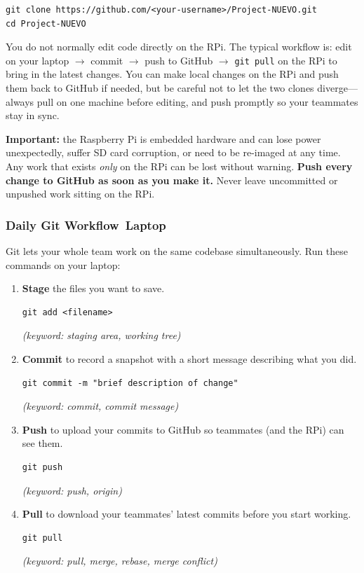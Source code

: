 \documentclass{ol-softwaremanual}
\newcommand{\onlaptop}{%
  \,\colorbox{green!25}{\footnotesize\sffamily\bfseries Laptop}}
\begin{document}
\begin{verbatim}
git clone https://github.com/<your-username>/Project-NUEVO.git
cd Project-NUEVO
\end{verbatim}

\noindent You do not normally edit code directly on the RPi.
The typical workflow is: edit on your laptop $\to$ commit $\to$ push to GitHub
$\to$ \texttt{git pull} on the RPi to bring in the latest changes.
You can make local changes on the RPi and push them back to GitHub if needed,
but be careful not to let the two clones diverge---always pull on one machine
before editing, and push promptly so your teammates stay in sync.

\noindent\textbf{Important:} the Raspberry Pi is embedded hardware and can lose
power unexpectedly, suffer SD card corruption, or need to be re-imaged at any
time. Any work that exists \emph{only} on the RPi can be lost without warning.
\textbf{Push every change to GitHub as soon as you make it.}
Never leave uncommitted or unpushed work sitting on the RPi.

\subsubsection{Daily Git Workflow\onlaptop}

Git lets your whole team work on the same codebase simultaneously.
Run these commands on your laptop:

\begin{enumerate}
  \item \textbf{Stage} the files you want to save.
\begin{verbatim}
git add <filename>
\end{verbatim}
        \hfill\textit{(keyword: staging area, working tree)}

  \item \textbf{Commit} to record a snapshot with a short message describing what you did.
\begin{verbatim}
git commit -m "brief description of change"
\end{verbatim}
        \hfill\textit{(keyword: commit, commit message)}

  \item \textbf{Push} to upload your commits to GitHub so teammates (and the RPi) can see them.
\begin{verbatim}
git push
\end{verbatim}
        \hfill\textit{(keyword: push, origin)}

  \item \textbf{Pull} to download your teammates' latest commits before you start working.
\begin{verbatim}
git pull
\end{verbatim}
        \hfill\textit{(keyword: pull, merge, rebase, merge conflict)}
\end{enumerate}
\end{document}
